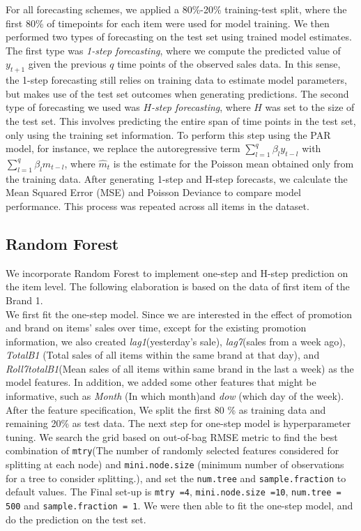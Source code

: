 \documentclass{article}
\begin{document}
\noindent For all forecasting schemes, we applied a 80\%-20\% training-test split, where the first 80\% of timepoints for each item were used for model training. We then performed two types of forecasting on the test set using trained model estimates. The first type was {\it 1-step forecasting}, where we compute the predicted value of $y_{t+1}$ given the previous $q$ time points of the observed sales data. In this sense, the 1-step forecasting still relies on training data to estimate model parameters, but makes use of the test set outcomes when generating predictions. The second type of forecasting we used was {\it $H$-step forecasting}, where $H$ was set to the size of the test set. This involves predicting the entire span of time points in the test set, only using the training set information. To perform this step using the PAR model, for instance, we replace the autoregressive term $\sum_{l=1}^q \beta_l y_{t-l}$ with $\sum_{l=1}^q \beta_l \hat{m}_{t-l}$, where $\hat{m}_{t}$ is the estimate for the Poisson mean obtained only from the training data. After generating 1-step and H-step forecasts, we calculate the Mean Squared Error (MSE) and Poisson Deviance to compare model performance. This process was repeated across all items in the dataset.

\subsection{Random Forest}
\noindent We incorporate Random Forest to implement one-step and H-step prediction on the item level. The following elaboration is based on the data of first item of the Brand 1. \\

\noindent We first fit the one-step model. Since we are interested in the effect of promotion and brand on items' sales over time, except for the existing promotion information, we also created \textit{lag1}(yesterday's sale), \textit{lag7}(sales from a week ago), \textit{TotalB1} (Total sales of all items within the same brand at that day), and \textit{Roll7totalB1}(Mean sales of all items within same brand in the last a week) as the model features. In addition, we added some other features that might be informative, such as \textit{Month} (In which month)and \textit{dow} (which day of the week). \\

\noindent After the feature specification, We split the first 80 \% as training data and remaining 20\% as test data. The next step for one-step model is hyperparameter tuning. We search the grid based on out-of-bag RMSE metric to find the best combination of \texttt{mtry}(The number of randomly selected features considered for splitting at each node) and \texttt{mini.node.size} (minimum number of observations for a tree to consider splitting.), and set the \texttt{num.tree} and \texttt{sample.fraction} to default values. The Final set-up is \texttt{mtry =4},  \texttt{mini.node.size =10}, \texttt{num.tree = 500} and \texttt{sample.fraction = 1}. We were then able to fit the one-step model, and do the prediction on the test set. \\
\end{document}
